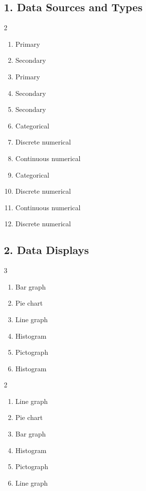 \documentclass[12pt,a4paper]{article}
\begin{document}
\subsection*{1. Data Sources and Types}
\begin{multicols}{2}\begin{enumerate}[nosep, label=\arabic*., start=1]
\item Primary
\item Secondary
\item Primary
\item Secondary
\item Secondary
\item Categorical
\item Discrete numerical
\item Continuous numerical
\item Categorical
\item Discrete numerical
\item Continuous numerical
\item Discrete numerical
\end{enumerate}\end{multicols}

\subsection*{2. Data Displays}
\begin{multicols}{3}\begin{enumerate}[nosep, label=\arabic*., start=1]
\item Bar graph
\item Pie chart
\item Line graph
\item Histogram
\item Pictograph
\item Histogram
\end{enumerate}\end{multicols}
\begin{multicols}{2}\begin{enumerate}[nosep, label=\arabic*., start=7]
\item Line graph
\item Pie chart
\item Bar graph
\item Histogram
\item Pictograph
\item Line graph
\end{enumerate}\end{multicols}
\end{document}
